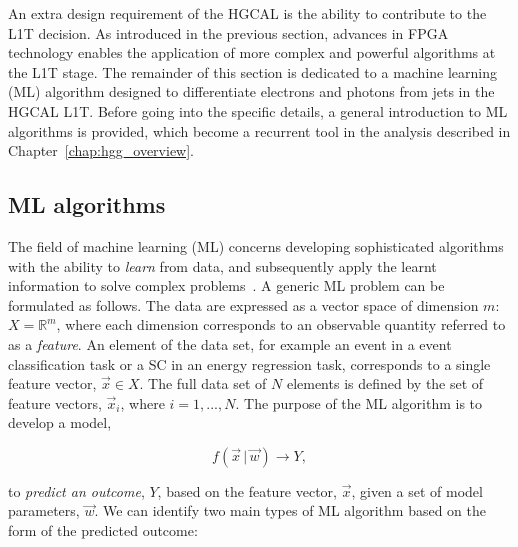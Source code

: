 
An extra design requirement of the HGCAL is the ability to contribute to the L1T decision.
As introduced in the previous section, advances in FPGA technology enables the application of more complex and powerful algorithms at the L1T stage. The remainder of this section is dedicated to a machine learning (ML) algorithm designed to differentiate electrons and photons from jets in the HGCAL L1T. Before going into the specific details, a general introduction to ML algorithms is provided, which become a recurrent tool in the \Hgg analysis described in Chapter~\ref{chap:hgg_overview}.

\subsection{ML algorithms}
The field of machine learning (ML) concerns developing sophisticated algorithms with the ability to \textit{learn} from data, and subsequently apply the learnt information to solve complex problems~\cite{}. A generic ML problem can be formulated as follows. The data are expressed as a vector space of dimension $m$: $X = \mathbb{R}^m$, where each dimension corresponds to an observable quantity referred to as a \textit{feature}. An element of the data set, for example an event in a event classification task or a SC in an energy regression task, corresponds to a single feature vector, $\vec{x} \in X$. The full data set of $N$ elements is defined by the set of feature vectors, $\vec{x}_i$, where $i=1,...,N$. The purpose of the ML algorithm is to develop a model,

\begin{equation}
    f(\vec{x}\,|\,\vec{w}) \rightarrow Y,
\end{equation}

\noindent
to \textit{predict an outcome}, $Y$, based on the feature vector, $\vec{x}$, given a set of model parameters, $\vec{w}$. We can identify two main types of ML algorithm based on the form of the predicted outcome:

